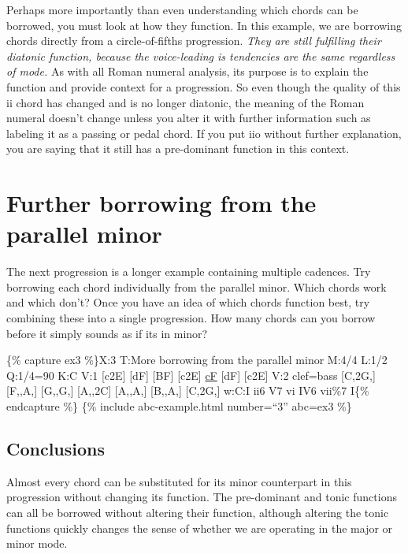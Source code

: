 \documentclass{book}
\begin{document}
Perhaps more importantly than even understanding which chords can be borrowed,
you must look at how they function. In this example, we are borrowing chords
directly from a circle-of-fifths progression. \emph{They are still fulfilling
their diatonic function, because the voice-leading is tendencies are the same
regardless of mode.} As with all Roman numeral analysis, its purpose is to
explain the function and provide context for a progression. So even though the
quality of this ii chord has changed and is no longer diatonic, the meaning of
the Roman numeral doesn't change unless you alter it with further information
such as labeling it as a passing or pedal chord. If you put iio without
further explanation, you are saying that it still has a pre-dominant function
in this context.

\hypertarget{further-borrowing-from-the-parallel-minor}{%
\section{Further borrowing from the parallel
minor}\label{further-borrowing-from-the-parallel-minor}}

The next progression is a longer example containing multiple cadences. Try
borrowing each chord individually from the parallel minor. Which chords work
and which don't? Once you have an idea of which chords function best, try
combining these into a single progression. How many chords can you borrow
before it simply sounds as if its in minor?

\{\% capture ex3 \%\}X:3 T:More borrowing from the parallel minor M:4/4 L:1/2
Q:1/4=90 K:C V:1 {[}c2E{]}\textbar{} {[}dF{]} {[}BF{]}\textbar{}
{[}c2E{]}\textbar{} \href{cantusFirmus.html}{cF} {[}dF{]}\textbar{}
{[}c2E{]}\textbar{]} V:2 clef=bass {[}C,2G,{]}\textbar{} {[}F,,A,{]}
{[}G,,G,{]}\textbar{} {[}A,,2C{]}\textbar{} {[}A,,A,{]} {[}B,,A,{]}\textbar{}
{[}C,2G,{]}\textbar{]} w:C:I ii6 V7 vi IV6 vii\%7 I\{\% endcapture \%\} \{\%
include abc-example.html number=``3'' abc=ex3 \%\}

\hypertarget{conclusions-9}{%
\subsection{Conclusions}\label{conclusions-9}}

Almost every chord can be substituted for its minor counterpart in this
progression without changing its function. The pre-dominant and tonic
functions can all be borrowed without altering their function, although
altering the tonic functions quickly changes the sense of whether we are
operating in the major or minor mode.
\end{document}
